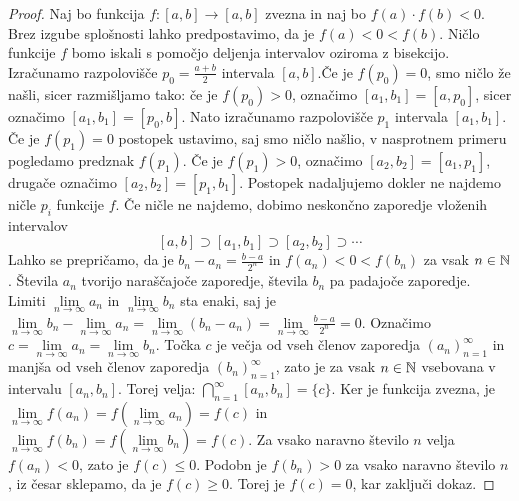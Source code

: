 \documentclass[../TG_magistrsko_delo_sections.tex]{subfiles}
\begin{document}
\begin{proof}
Naj bo funkcija $f:[a, b] \to [a, b]$ zvezna in naj bo $f(a)\cdot f(b) < 0$. Brez izgube splošnosti lahko predpostavimo, da je $f(a) < 0 < f(b)$. Ničlo funkcije $f$ bomo iskali s pomočjo deljenja intervalov oziroma z bisekcijo. Izračunamo razpolovišče $p_0=\frac{a+b}{2}$ intervala $[a, b]$.Če je $f(p_0)=0$, smo ničlo že našli, sicer razmišljamo tako: če je $f(p_0) >0$, označimo $[a_1, b_1] =  [a, p_0]$, sicer označimo $[a_1, b_1] =  [p_0, b]$. Nato izračunamo razpolovišče $p_1$ intervala $[a_1, b_1]$. Če je $f(p_1)=0$ postopek ustavimo, saj smo ničlo našlio, v nasprotnem primeru pogledamo predznak $f(p_1)$. Če je $f(p_1) >0$, označimo $[a_2, b_2] =  [a_1, p_1]$, drugače označimo $[a_2, b_2] =  [p_1, b_1]$. Postopek nadaljujemo dokler ne najdemo ničle $p_i$ funkcije $f$. Če ničle ne najdemo, dobimo neskončno zaporedje vloženih intervalov 
$$ [a, b] \supset [a_1, b_1] \supset [a_2, b_2] \supset \cdots$$
Lahko se prepričamo, da je $b_n - a_n = \frac{b-a}{2^n}$ in $f(a_n)<0<f(b_n)$ za vsak $n\in \mathbb N$. Števila $a_n$ tvorijo naraščajoče zaporedje, števila $b_n$ pa padajoče zaporedje.  Limiti $\lim\limits_{n \to \infty} a_n$ in $\lim\limits_{n \to \infty} b_n$ sta enaki, saj je 
$\lim\limits_{n \to \infty} b_n - \lim\limits_{n \to \infty} a_n = \lim\limits_{n \to \infty} (b_n - a_n) = \lim\limits_{n \to \infty} \frac{b - a}{2^n} = 0$. Označimo $c = \lim\limits_{n \to \infty} a_n = \lim\limits_{n \to \infty} b_n$. Točka $c$ je večja od vseh členov zaporedja $\left(a_n \right)_{n=1}^{\infty}$ in manjša od vseh členov zaporedja $\left(b_n \right)_{n=1}^{\infty}$, zato je za vsak $n \in \mathbb N$ vsebovana v intervalu $[a_n, b_n]$. Torej velja:
$\bigcap\limits_{n=1}^{\infty} [a_n, b_n] = \{c\}$. 
Ker je funkcija zvezna, je 
$\lim\limits_{n \to \infty} f(a_n) = f\left(\lim\limits_{n \to \infty} a_n\right) = f(c)$
in 
$\lim\limits_{n \to \infty} f(b_n) = f\left(\lim\limits_{n \to \infty} b_n\right) = f(c)$.
Za vsako naravno število $n$ velja $f(a_n) <0$, zato je $f(c) \leq 0$. Podobn je $f(b_n) > 0$ za vsako naravno število $n$, iz česar sklepamo, da je $f(c) \geq 0$. Torej je $f(c) = 0$, kar zaključi dokaz.
\end{proof}
\end{document}

